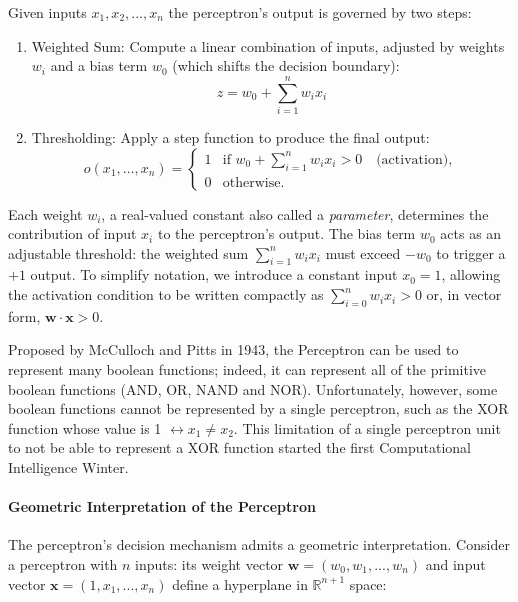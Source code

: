 \documentclass{tufte-handout}
\begin{document}
Given inputs $x_1, x_2, ..., x_n$ the perceptron's output is governed by two steps:
\begin{enumerate}
    \item Weighted Sum: Compute a linear combination of inputs, adjusted by weights $w_i$ and a bias term $w_0$ (which shifts the decision boundary):
    \begin{equation}
        z = w_0 + \sum_{i=1}^{n}w_ix_i
    \end{equation}
    \item Thresholding:  Apply a step function to produce the final output:
    \begin{equation} \label{perceptron}
o(x_1, \dots, x_n) =
\begin{cases}
1 & \text{if } w_0 + \sum_{i=1}^n w_i x_i > 0 \quad \text{(activation)}, \\ 0 & \text{otherwise.}
\end{cases}
\end{equation}
\end{enumerate}

Each weight \( w_i \), a real-valued constant also called a \textit{parameter}, determines the contribution of input \( x_i \) to the perceptron's output. The bias term \( w_0 \) acts as an adjustable threshold: the weighted sum \( \sum_{i=1}^n w_i x_i \) must exceed \( -w_0 \) to trigger a \( +1 \) output. To simplify notation, we introduce a constant input \( x_0 = 1 \), allowing the activation condition to be written compactly as \( \sum_{i=0}^n w_i x_i > 0 \) or, in vector form, \( \mathbf{w} \cdot \mathbf{x} > 0 \).

Proposed by McCulloch and Pitts in 1943, the Perceptron can be used to represent many boolean functions; indeed, it can represent all of the primitive boolean functions (AND, OR, NAND and NOR). Unfortunately, however, some boolean functions cannot be represented by a single perceptron, such as the XOR function whose value is 1 $\leftrightarrow x_1 \neq x_2$. This limitation of a single perceptron unit to not be able to represent a XOR function started the first Computational Intelligence Winter.

\paragraph{Geometric Interpretation of the Perceptron}

The perceptron's decision mechanism admits a geometric interpretation. Consider a perceptron with $n$ inputs: its weight vector $\mathbf{w} = (w_0, w_1, ..., w_n)$ and input vector $\mathbf{x} = (1, x_1, ..., x_n)$ define a hyperplane in $\mathbb{R}^{n+1}$ space:
\end{document}
